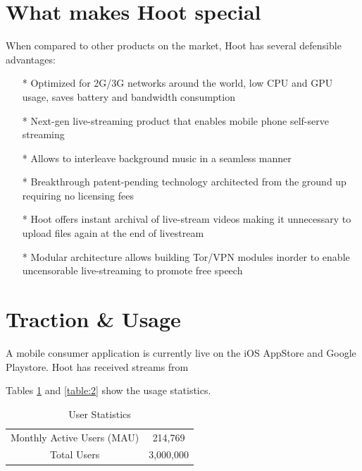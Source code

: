 \documentclass{article}
\begin{document}
\section{What makes Hoot special}
When compared to other products on the market, Hoot has several defensible advantages:
\begin{itemize}
\item[*]Optimized for 2G/3G networks around the world, low CPU and GPU usage, saves battery and bandwidth consumption
\item[*]Next-gen live-streaming product that enables mobile phone self-serve streaming 
\item[*]Allows to interleave background music in a seamless manner
\item[*]Breakthrough patent-pending technology architected from the ground up requiring no licensing fees
\item[*]Hoot offers instant archival of live-stream videos making it unnecessary to upload files again at the end of livestream
\item[*]Modular architecture allows building Tor/VPN modules inorder to enable uncensorable live-streaming to promote free speech
\end{itemize}


\section{Traction \& Usage}
A mobile consumer application is currently live on the iOS AppStore and Google Playstore. Hoot has received streams from 


Tables \ref{table:1} and \ref{table:2} show the usage statistics.

\setlength{\arrayrulewidth}{.7mm}
\setlength{\tabcolsep}{18pt}
\renewcommand{\arraystretch}{2.0} 
 


\begin{table}[!htb]
\centering
\begin{tabular}{ |c|c| }
\hline
\rowcolor{lightgray} \multicolumn{2}{|c|}{User Statistics} \\
\hline
Monthly Active Users (MAU) & 214,769 \\
Total Users & 3,000,000 \\
\hline
\end{tabular}
\caption{User Statistics}
\label{table:1}
\end{table}
\end{document}
